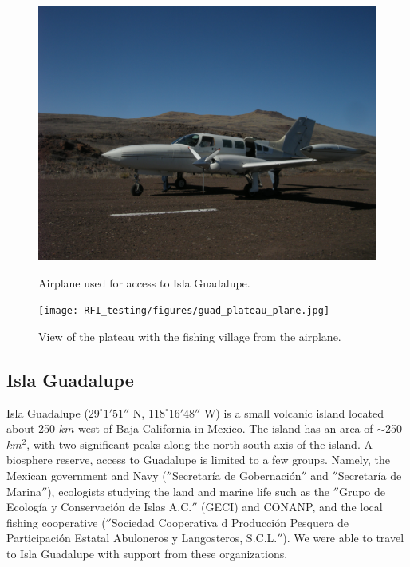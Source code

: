 \begin{figure}[htb]
\centering
\begin{minipage}[b]{0.455\textwidth}
\centering
\includegraphics[width=0.95\linewidth]{RFI_testing/figures/guad_plane.jpg}
\caption{Airplane used for access to Isla Guadalupe.}
\label{Fig:guadplane}
\end{minipage}%
\begin{minipage}[b]{0.02\textwidth}
\hspace{1cm}
\end{minipage}%
\begin{minipage}[b]{0.485\textwidth}
\centering
\texttt{[image: RFI\_testing/figures/guad\_plateau\_plane.jpg]}
\caption{View of the plateau with the fishing village from the airplane.}
\label{Fig:guadplateau}
\end{minipage}
\end{figure}


\subsection{Isla Guadalupe}

Isla Guadalupe ($29^\circ 1' 51''$ N, $118^\circ 16' 48''$ W) is a small volcanic island located about 250 $km$ west of Baja California in Mexico. The island has an area of $\sim$250 $km^2$, with two significant peaks along the north-south axis of the island. A biosphere reserve, access to Guadalupe is limited to a few groups. Namely, the Mexican government and Navy ($''$Secretar\'{i}a de Gobernaci\'{o}n$''$ and $''$Secretar\'{i}a de Marina$''$), ecologists studying the land and marine life such as the $''$Grupo de Ecolog\'{i}a y Conservaci\'{o}n de Islas A.C.$''$ (GECI) and CONANP, and the local fishing cooperative ($''$Sociedad Cooperativa d Producci\'{o}n Pesquera de Participaci\'{o}n Estatal Abuloneros y Langosteros, S.C.L.$''$). We were able to travel to Isla Guadalupe with support from these organizations. 

